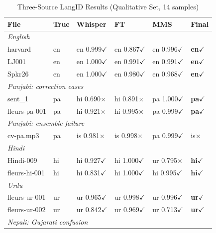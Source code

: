 \documentclass[conference]{IEEEtran}
\begin{document}
\begin{table}[htbp]
\caption{Three-Source LangID Results (Qualitative Set, 14 samples)}
\label{tab:langid}
\begin{center}
\small
\begin{tabular}{p{2.0cm}lp{2.0cm}p{1.6cm}p{1.6cm}l}
\toprule
\textbf{File} & \textbf{True} & \textbf{Whisper} & \textbf{FT} & \textbf{MMS} & \textbf{Final} \\
\midrule
\multicolumn{6}{l}{\footnotesize\textit{English}} \\
harvard        & en & en 0.999$\checkmark$ & en 0.867$\checkmark$ & en 0.996$\checkmark$ & \textbf{en}$\checkmark$ \\
LJ001          & en & en 1.000$\checkmark$ & en 0.991$\checkmark$ & en 0.991$\checkmark$ & \textbf{en}$\checkmark$ \\
Spkr26         & en & en 1.000$\checkmark$ & en 0.980$\checkmark$ & en 0.968$\checkmark$ & \textbf{en}$\checkmark$ \\
\midrule
\multicolumn{6}{l}{\footnotesize\textit{Punjabi: correction cases}} \\
sent\_1        & pa & hi 0.690$\times$ & hi 0.891$\times$ & pa 1.000$\checkmark$ & \textbf{pa}$\checkmark$ \\
fleurs-pa-001  & pa & hi 0.921$\times$ & hi 0.995$\times$ & pa 0.999$\checkmark$ & \textbf{pa}$\checkmark$ \\
\multicolumn{6}{l}{\footnotesize\textit{Punjabi: ensemble failure}} \\
cv-pa.mp3      & pa & is 0.981$\times$ & is 0.998$\times$ & pa 0.999$\checkmark$ & is$\times$ \\
\midrule
\multicolumn{6}{l}{\footnotesize\textit{Hindi}} \\
Hindi-009      & hi & hi 0.927$\checkmark$ & hi 1.000$\checkmark$ & ur 0.795$\times$ & \textbf{hi}$\checkmark$ \\
fleurs-hi-001  & hi & hi 0.831$\checkmark$ & hi 1.000$\checkmark$ & hi 0.995$\checkmark$ & \textbf{hi}$\checkmark$ \\
\midrule
\multicolumn{6}{l}{\footnotesize\textit{Urdu}} \\
fleurs-ur-001  & ur & ur 0.965$\checkmark$ & ur 0.998$\checkmark$ & ur 0.996$\checkmark$ & \textbf{ur}$\checkmark$ \\
fleurs-ur-002  & ur & ur 0.842$\checkmark$ & ur 0.969$\checkmark$ & ur 0.713$\checkmark$ & \textbf{ur}$\checkmark$ \\
\midrule
\multicolumn{6}{l}{\footnotesize\textit{Nepali: Gujarati confusion}} \\

\end{tabular}
\end{center}
\end{table}
\end{document}
